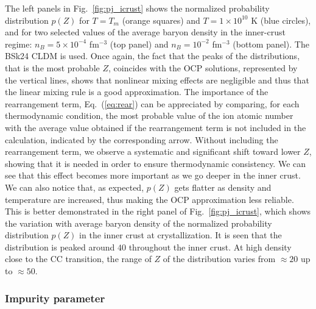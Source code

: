 %
The left panels in Fig.~\ref{fig:pj_icrust} shows the normalized
probability distribution $p(Z)$ for $T=T_m$ (orange squares) and 
$T=1\times 10^{10}$ K (blue circles), and for
two selected values of the average baryon density in the inner-crust regime:
$n_B = 5\times 10^{-4}$ fm$^{-3}$ (top panel) and $n_B = 10^{-2}$ fm$^{-3}$
(bottom panel). The BSk24 CLDM is used.
%
Once again, the fact that the peaks of the distributions, that is the most
probable $Z$, coincides with the OCP solutions, represented by the vertical 
lines, shows that nonlinear mixing effects are negligible and thus 
that the linear mixing rule is a good approximation.
%
The importance of the rearrangement term, Eq.~(\ref{eq:rear}) can be 
appreciated by comparing, for each thermodynamic condition, the most probable
value of the ion atomic number with the average value obtained if the 
rearrangement term is not included in the calculation, indicated by the
corresponding arrow. Without including the rearrangement term, we observe a 
systematic and significant shift toward lower $Z$, showing that it is needed 
in order to ensure thermodynamic consistency.  We can see that this effect
becomes more important as we go deeper in the inner crust.
% 
We can also notice that, as expected, $p(Z)$ gets flatter as
density and temperature are increased, thus making the OCP approximation less
reliable. This is better demonstrated in the right panel of
Fig.~\ref{fig:pj_icrust}, which shows the variation with average baryon density 
of the normalized probability distribution $p(Z)$ in the inner crust at
crystallization.
It is seen that the distribution is peaked around $40$ throughout the inner
crust. At high density close to the CC transition, the range of $Z$ of the
distribution varies from $\approx 20$ up to $\approx 50$.

\subsubsection{Impurity parameter}\label{subsubsec:eos_qimp}

